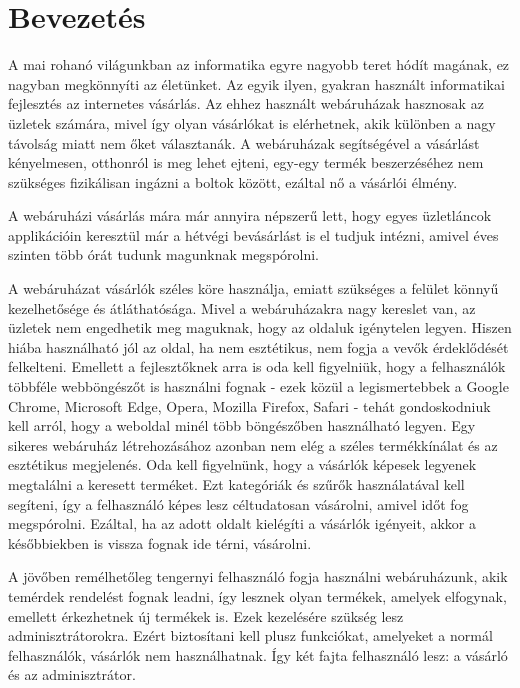 \chapter{Bevezetés}

A mai rohanó világunkban az informatika egyre nagyobb teret hódít magának, ez nagyban megkönnyíti az életünket. Az egyik ilyen, gyakran használt informatikai fejlesztés az internetes vásárlás. Az ehhez használt webáruházak hasznosak az üzletek számára, mivel így olyan vásárlókat is elérhetnek, akik különben a nagy távolság miatt nem őket választanák. A webáruházak segítségével a vásárlást kényelmesen, otthonról is meg lehet ejteni, egy-egy termék beszerzéséhez nem szükséges fizikálisan ingázni a boltok között, ezáltal nő a vásárlói élmény. 

A webáruházi vásárlás mára már annyira népszerű lett, hogy egyes üzletláncok applikációin keresztül már a hétvégi bevásárlást is el tudjuk intézni, amivel éves szinten több órát tudunk magunknak megspórolni.

A webáruházat vásárlók széles köre használja, emiatt szükséges a felület könnyű kezelhetősége és átláthatósága. Mivel a webáruházakra nagy kereslet van, az üzletek nem engedhetik meg maguknak, hogy az oldaluk igénytelen legyen. Hiszen hiába használható jól az oldal, ha nem esztétikus, nem fogja a vevők érdeklődését felkelteni. Emellett a fejlesztőknek arra is oda kell figyelniük, hogy a felhasználók többféle webböngészőt is használni fognak - ezek közül a legismertebbek a Google Chrome, Microsoft Edge, Opera, Mozilla Firefox, Safari - tehát gondoskodniuk kell arról, hogy a weboldal minél több böngészőben használható legyen. Egy sikeres webáruház létrehozásához azonban nem elég a széles termékkínálat és az esztétikus megjelenés. Oda kell figyelnünk, hogy a vásárlók képesek legyenek megtalálni a keresett terméket. Ezt kategóriák és szűrők használatával kell segíteni, így a felhasználó képes lesz céltudatosan vásárolni, amivel időt fog megspórolni. Ezáltal, ha az adott oldalt kielégíti a vásárlók igényeit, akkor a későbbiekben is vissza fognak ide térni, vásárolni.

A jövőben remélhetőleg tengernyi felhasználó fogja használni webáruházunk, akik temérdek rendelést fognak leadni, így lesznek olyan termékek, amelyek elfogynak, emellett érkezhetnek új termékek is. Ezek kezelésére szükség lesz adminisztrátorokra. Ezért biztosítani kell plusz funkciókat, amelyeket a normál felhasználók, vásárlók nem használhatnak. Így két fajta felhasználó lesz: a vásárló és az adminisztrátor.

